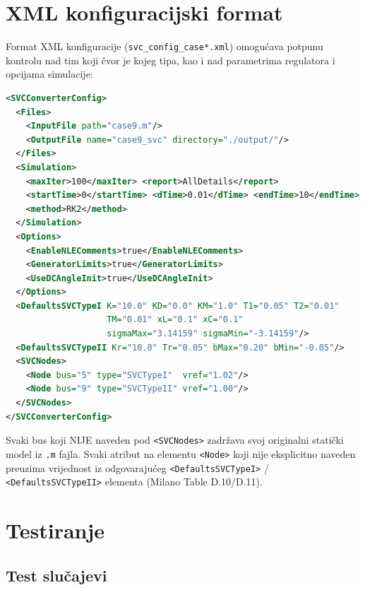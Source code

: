 \documentclass[11pt,a4paper]{report}
\begin{document}
\chapter{XML konfiguracijski format}
\label{ch:xml}

Format XML konfiguracije (\texttt{svc\_config\_case*.xml}) omogućava potpunu kontrolu nad
tim koji čvor je kojeg tipa, kao i nad parametrima regulatora i opcijama simulacije:

\begin{lstlisting}[language=XML,caption={Struktura SVC XML konfiguracije (primjer za \texttt{case9})},label={lst:xml-config}]
<SVCConverterConfig>
  <Files>
    <InputFile path="case9.m"/>
    <OutputFile name="case9_svc" directory="./output/"/>
  </Files>
  <Simulation>
    <maxIter>100</maxIter> <report>AllDetails</report>
    <startTime>0</startTime> <dTime>0.01</dTime> <endTime>10</endTime>
    <method>RK2</method>
  </Simulation>
  <Options>
    <EnableNLEComments>true</EnableNLEComments>
    <GeneratorLimits>true</GeneratorLimits>
    <UseDCAngleInit>true</UseDCAngleInit>
  </Options>
  <DefaultsSVCTypeI K="10.0" KD="0.0" KM="1.0" T1="0.05" T2="0.01"
                    TM="0.01" xL="0.1" xC="0.1"
                    sigmaMax="3.14159" sigmaMin="-3.14159"/>
  <DefaultsSVCTypeII Kr="10.0" Tr="0.05" bMax="0.20" bMin="-0.05"/>
  <SVCNodes>
    <Node bus="5" type="SVCTypeI"  vref="1.02"/>
    <Node bus="9" type="SVCTypeII" vref="1.00"/>
  </SVCNodes>
</SVCConverterConfig>
\end{lstlisting}

Svaki bus koji NIJE naveden pod \texttt{<SVCNodes>} zadržava svoj originalni statički
model iz \texttt{.m} fajla. Svaki atribut na elementu \texttt{<Node>} koji nije eksplicitno
naveden preuzima vrijednost iz odgovarajućeg \texttt{<DefaultsSVCTypeI>} /
\texttt{<DefaultsSVCTypeII>} elementa (Milano Table D.10/D.11).


\chapter{Testiranje}
\label{ch:testiranje}

\section{Test slučajevi}
\end{document}
